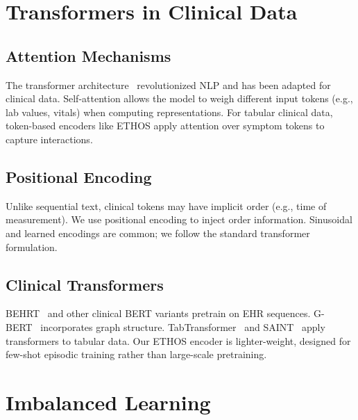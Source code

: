 \section{Transformers in Clinical Data}

\subsection{Attention Mechanisms}

The transformer architecture~\cite{vaswani2017attention,devlin2019bert} revolutionized NLP and has been adapted for clinical data. Self-attention allows the model to weigh different input tokens (e.g., lab values, vitals) when computing representations. For tabular clinical data, token-based encoders like ETHOS apply attention over symptom tokens to capture interactions.

\subsection{Positional Encoding}

Unlike sequential text, clinical tokens may have implicit order (e.g., time of measurement). We use positional encoding to inject order information. Sinusoidal and learned encodings are common; we follow the standard transformer formulation.

\subsection{Clinical Transformers}

BEHRT~\cite{li2020behrt} and other clinical BERT variants pretrain on EHR sequences. G-BERT~\cite{shang2020gbert} incorporates graph structure. TabTransformer~\cite{huang2020tabtransformer} and SAINT~\cite{somepalli2021saint} apply transformers to tabular data. Our ETHOS encoder is lighter-weight, designed for few-shot episodic training rather than large-scale pretraining.

\section{Imbalanced Learning}

